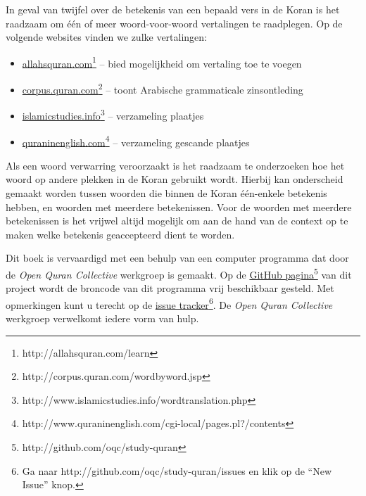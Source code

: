 \noindent In geval van twijfel over de betekenis van een bepaald vers in de Koran is het raadzaam om één of meer woord-voor-woord vertalingen te raadplegen.  Op de volgende websites vinden we zulke vertalingen:
\begin{itemize}
  \item \href{http://allahsquran.com/learn}{allahsquran.com}\footnote{\textsf{http://allahsquran.com/learn}} -- bied mogelijkheid om vertaling toe te voegen
  \item \href{http://corpus.quran.com/wordbyword.jsp}{corpus.quran.com}\footnote{\textsf{http://corpus.quran.com/wordbyword.jsp}} -- toont Arabische grammaticale zinsontleding
  \item \href{http://www.islamicstudies.info/wordtranslation.php}{islamicstudies.info}\footnote{\textsf{http://www.islamicstudies.info/wordtranslation.php}} -- verzameling plaatjes
  \item \href{http://www.quraninenglish.com/cgi-local/pages.pl?/contents}{quraninenglish.com}\footnote{\textsf{http://www.quraninenglish.com/cgi-local/pages.pl?/contents}} -- verzameling gescande plaatjes
\end{itemize}
Als een woord verwarring veroorzaakt is het raadzaam te onderzoeken hoe het woord op andere plekken in de Koran gebruikt wordt.  Hierbij kan onderscheid gemaakt worden tussen woorden die binnen de Koran één-enkele betekenis hebben, en woorden met meerdere betekenissen.  Voor de woorden met meerdere betekenissen is het vrijwel altijd mogelijk om aan de hand van de context op te maken welke betekenis geaccepteerd dient te worden.
\vspace{0.3cm}

\noindent Dit boek is vervaardigd met een behulp van een computer programma dat door de \emph{Open Quran Collective} werkgroep is gemaakt.  Op de \href{http://github.com/oqc/study-quran}{GitHub pagina}\footnote{\textsf{http://github.com/oqc/study-quran}} van dit project wordt de broncode van dit programma vrij beschikbaar gesteld.  Met opmerkingen kunt u terecht op de \href{http://github.com/oqc/study-quran/issues}{issue tracker}\footnote{Ga naar \textsf{http://github.com/oqc/study-quran/issues} en klik op de ``New Issue'' knop.}.  De \emph{Open Quran Collective} werkgroep verwelkomt iedere vorm van hulp.





